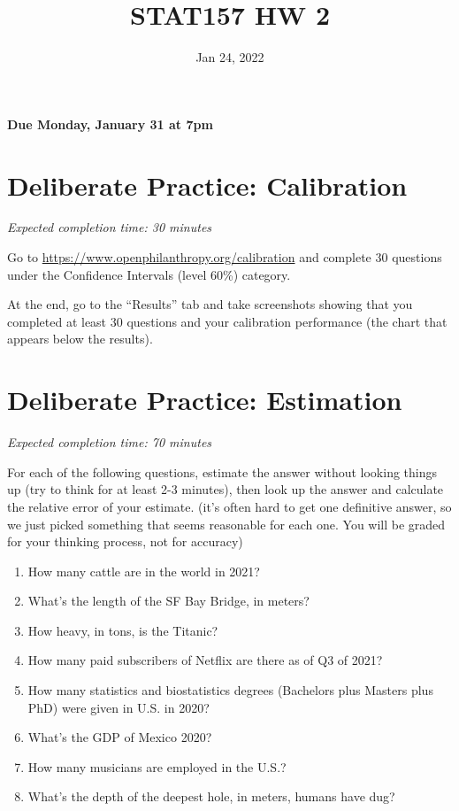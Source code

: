 \documentclass[11pt]{article}
\title{STAT157 HW 2}
\date{Jan 24, 2022}
\begin{document}
\maketitle

\hfill \textbf{Due Monday, January 31 at 7pm}

\section*{Deliberate Practice: Calibration}

\emph{Expected completion time: 30 minutes}

Go to \url{https://www.openphilanthropy.org/calibration} and complete 30 questions under the Confidence Intervals (level 60\%) category.

At the end, go to the ``Results'' tab and take screenshots showing that 
you completed at least 30 questions and your calibration 
performance (the chart that appears below the results).

\section*{Deliberate Practice: Estimation}

\emph{Expected completion time: 70 minutes}

For each of the following questions, estimate the answer without looking things up (try to think for at least 2-3 minutes), then look up the answer and calculate the relative error of your estimate.  (it's often hard to get one definitive answer, so we just picked something that seems reasonable for each one. You will be graded for your thinking process, not for accuracy) 

\begin{enumerate}
	\item How many cattle are in the world in 2021? 
	\item What's the length of the SF Bay Bridge, in meters? 
	\item How heavy, in tons, is the Titanic? 
	\item How many paid subscribers of Netflix are there as of Q3 of 2021?
	\item How many statistics and biostatistics degrees (Bachelors plus Masters plus PhD) were given in U.S. in 2020? 
	\item What's the GDP of Mexico 2020? 
	\item How many musicians are employed in the U.S.?
	\item What's the depth of the deepest hole, in meters, humans have dug? 
\end{enumerate}
\end{document}
